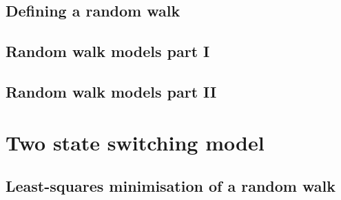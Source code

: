 \documentclass[../full_thesis/full_thesis.tex]{subfiles}
\newcommand{\thisdir}{../analytic_timing_noise_cgw}
\begin{document}
\subsection{Defining a random walk}
\label{sec: Defining a random walk}


\subsection{Random walk models part I}
\label{sec: Random walk models part I}


\subsection{Random walk models part II} 
\label{sec: Random walk models part II}


\section{Two state switching model}
\label{sec: Two state switching model}



\begin{subappendices}
    

\section{Least-squares minimisation of a random walk}
\label{sec: Least-squares minimisation of a random walk}



\end{subappendices}


\biblio
\end{document}
